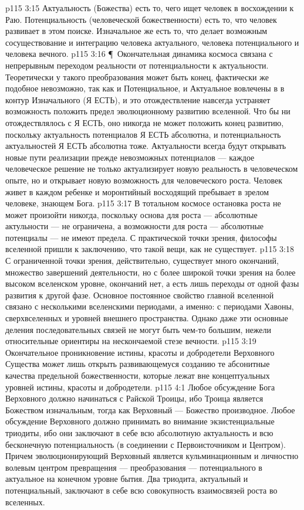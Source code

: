 \vs p115 3:15 Актуальность (Божества) есть то, чего ищет человек в восхождении к Раю. Потенциальность (человеческой божественности) есть то, что человек развивает в этом поиске. Изначальное же есть то, что делает возможным сосуществование и интеграцию человека актуального, человека потенциального и человека вечного.
\vs p115 3:16 \P\ Окончательная динамика космоса связана с непрерывным переходом реальности от потенциальности к актуальности. Теоретически у такого преобразования может быть конец, фактически же подобное невозможно, так как и Потенциальное, и Актуальное вовлечены в в контур Изначального (Я ЕСТЬ), и это отождествление навсегда устраняет возможность положить предел эволюционному развитию вселенной. Что бы ни отождествлялось с Я ЕСТЬ, оно никогда не может положить конец развитию, поскольку актуальность потенциалов Я ЕСТЬ абсолютна, и потенциальность актуальностей Я ЕСТЬ абсолютна тоже. Актуальности всегда будут открывать новые пути реализации прежде невозможных потенциалов --- каждое человеческое решение не только актуализирует новую реальность в человеческом опыте, но и открывает новую возможность для человеческого роста. Человек живет в каждом ребенке и моронтийный восходящий пребывает в зрелом человеке, знающем Бога.
\vs p115 3:17 В тотальном космосе остановка роста не может произойти никогда, поскольку основа для роста --- абсолютные актульности --- не ограничена, а возможности для роста --- абсолютные потенциалы --- не имеют предела. С практической точки зрения, философы вселенной пришли к заключению, что такой вещи, как  не существует.
\vs p115 3:18 С ограниченной точки зрения, действительно, существует много окончаний, множество завершений деятельности, но с более широкой точки зрения на более высоком вселенском уровне, окончаний нет, а есть лишь переходы от одной фазы развития к другой фазе. Основное постоянное свойство главной вселенной связано с несколькими вселенскими периодами, а именно: с периодами Хавоны, сверхвселенных и уровней внешнего пространства. Однако даже эти основные деления последовательных связей не могут быть чем\hyp{}то большим, нежели относительные ориентиры на нескончаемой стезе вечности.
\vs p115 3:19 Окончательное проникновение истины, красоты и добродетели Верховного Существа может лишь открыть развивающемуся созданию те абсонитные качества предельной божественности, которые лежат вне концептуальных уровней истины, красоты и добродетели.
\vs p115 4:1 Любое обсуждение  Бога Верховного должно начинаться с Райской Троицы, ибо Троица является Божеством изначальным, тогда как Верховный --- Божество производное. Любое обсуждение  Верховного должно принимать во внимание экзистенциальные триодиты, ибо они заключают в себе всю абсолютную актуальность и всю бесконечную потенциальность (в соединении с Первоисточником и Центром). Причем эволюционирующий Верховный является кульминационным и личностно волевым центром превращения --- преобразования --- потенциального в актуальное на конечном уровне бытия. Два триодита, актуальный и потенциальный, заключают в себе всю совокупность взаимосвязей роста во вселенных.
